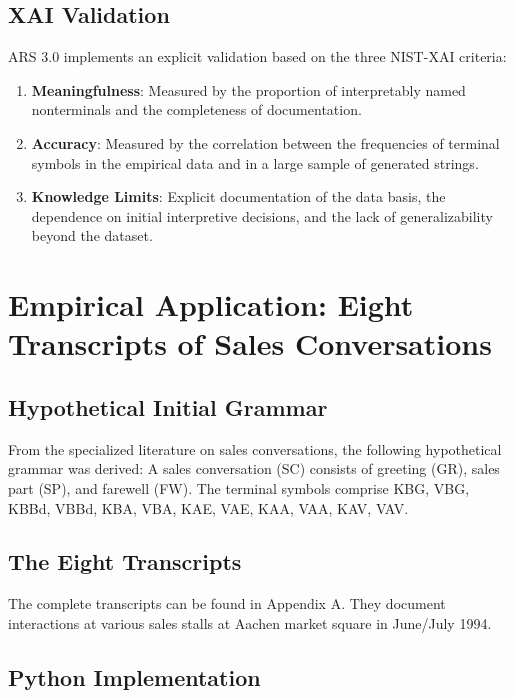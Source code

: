 \documentclass[
  12pt,
  a4paper,
  oneside,
  titlepage
]{article}
\begin{document}
\subsection{XAI Validation}

ARS 3.0 implements an explicit validation based on the three 
NIST-XAI criteria:

\begin{enumerate}
    \item \textbf{Meaningfulness}: Measured by the proportion of 
    interpretably named nonterminals and the completeness of documentation.
    
    \item \textbf{Accuracy}: Measured by the correlation between the 
    frequencies of terminal symbols in the empirical data and in a large 
    sample of generated strings.
    
    \item \textbf{Knowledge Limits}: Explicit documentation of the data 
    basis, the dependence on initial interpretive decisions, and the lack 
    of generalizability beyond the dataset.
\end{enumerate}

\section{Empirical Application: Eight Transcripts of Sales Conversations}

\subsection{Hypothetical Initial Grammar}

From the specialized literature on sales conversations, the following 
hypothetical grammar was derived: A sales conversation (SC) consists of 
greeting (GR), sales part (SP), and farewell (FW). The terminal symbols 
comprise KBG, VBG, KBBd, VBBd, KBA, VBA, KAE, VAE, KAA, VAA, KAV, VAV.

\subsection{The Eight Transcripts}

The complete transcripts can be found in Appendix A. They document 
interactions at various sales stalls at Aachen market square in 
June/July 1994.

\subsection{Python Implementation}
\end{document}
